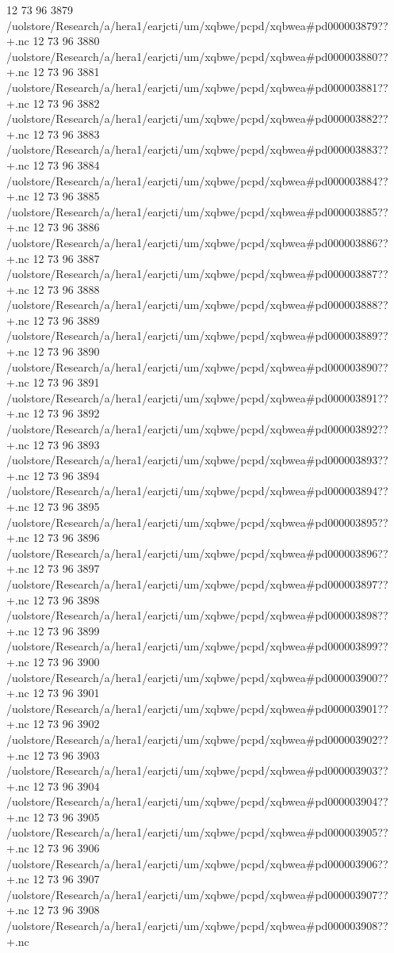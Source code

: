 12 73 96
3879
/uolstore/Research/a/hera1/earjcti/um/xqbwe/pcpd/xqbwea#pd000003879??+.nc
12 73 96
3880
/uolstore/Research/a/hera1/earjcti/um/xqbwe/pcpd/xqbwea#pd000003880??+.nc
12 73 96
3881
/uolstore/Research/a/hera1/earjcti/um/xqbwe/pcpd/xqbwea#pd000003881??+.nc
12 73 96
3882
/uolstore/Research/a/hera1/earjcti/um/xqbwe/pcpd/xqbwea#pd000003882??+.nc
12 73 96
3883
/uolstore/Research/a/hera1/earjcti/um/xqbwe/pcpd/xqbwea#pd000003883??+.nc
12 73 96
3884
/uolstore/Research/a/hera1/earjcti/um/xqbwe/pcpd/xqbwea#pd000003884??+.nc
12 73 96
3885
/uolstore/Research/a/hera1/earjcti/um/xqbwe/pcpd/xqbwea#pd000003885??+.nc
12 73 96
3886
/uolstore/Research/a/hera1/earjcti/um/xqbwe/pcpd/xqbwea#pd000003886??+.nc
12 73 96
3887
/uolstore/Research/a/hera1/earjcti/um/xqbwe/pcpd/xqbwea#pd000003887??+.nc
12 73 96
3888
/uolstore/Research/a/hera1/earjcti/um/xqbwe/pcpd/xqbwea#pd000003888??+.nc
12 73 96
3889
/uolstore/Research/a/hera1/earjcti/um/xqbwe/pcpd/xqbwea#pd000003889??+.nc
12 73 96
3890
/uolstore/Research/a/hera1/earjcti/um/xqbwe/pcpd/xqbwea#pd000003890??+.nc
12 73 96
3891
/uolstore/Research/a/hera1/earjcti/um/xqbwe/pcpd/xqbwea#pd000003891??+.nc
12 73 96
3892
/uolstore/Research/a/hera1/earjcti/um/xqbwe/pcpd/xqbwea#pd000003892??+.nc
12 73 96
3893
/uolstore/Research/a/hera1/earjcti/um/xqbwe/pcpd/xqbwea#pd000003893??+.nc
12 73 96
3894
/uolstore/Research/a/hera1/earjcti/um/xqbwe/pcpd/xqbwea#pd000003894??+.nc
12 73 96
3895
/uolstore/Research/a/hera1/earjcti/um/xqbwe/pcpd/xqbwea#pd000003895??+.nc
12 73 96
3896
/uolstore/Research/a/hera1/earjcti/um/xqbwe/pcpd/xqbwea#pd000003896??+.nc
12 73 96
3897
/uolstore/Research/a/hera1/earjcti/um/xqbwe/pcpd/xqbwea#pd000003897??+.nc
12 73 96
3898
/uolstore/Research/a/hera1/earjcti/um/xqbwe/pcpd/xqbwea#pd000003898??+.nc
12 73 96
3899
/uolstore/Research/a/hera1/earjcti/um/xqbwe/pcpd/xqbwea#pd000003899??+.nc
12 73 96
3900
/uolstore/Research/a/hera1/earjcti/um/xqbwe/pcpd/xqbwea#pd000003900??+.nc
12 73 96
3901
/uolstore/Research/a/hera1/earjcti/um/xqbwe/pcpd/xqbwea#pd000003901??+.nc
12 73 96
3902
/uolstore/Research/a/hera1/earjcti/um/xqbwe/pcpd/xqbwea#pd000003902??+.nc
12 73 96
3903
/uolstore/Research/a/hera1/earjcti/um/xqbwe/pcpd/xqbwea#pd000003903??+.nc
12 73 96
3904
/uolstore/Research/a/hera1/earjcti/um/xqbwe/pcpd/xqbwea#pd000003904??+.nc
12 73 96
3905
/uolstore/Research/a/hera1/earjcti/um/xqbwe/pcpd/xqbwea#pd000003905??+.nc
12 73 96
3906
/uolstore/Research/a/hera1/earjcti/um/xqbwe/pcpd/xqbwea#pd000003906??+.nc
12 73 96
3907
/uolstore/Research/a/hera1/earjcti/um/xqbwe/pcpd/xqbwea#pd000003907??+.nc
12 73 96
3908
/uolstore/Research/a/hera1/earjcti/um/xqbwe/pcpd/xqbwea#pd000003908??+.nc
